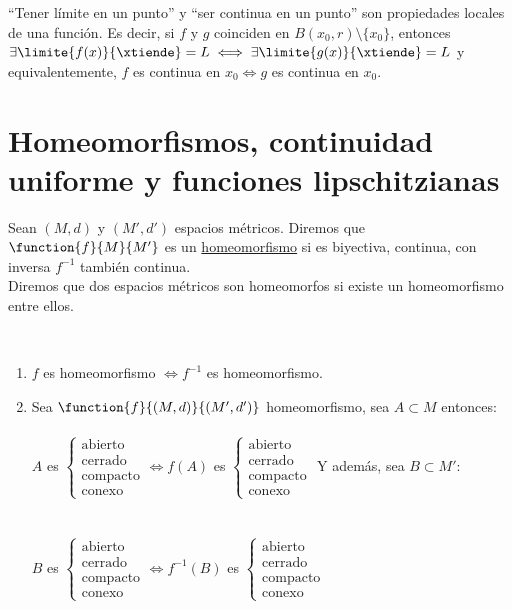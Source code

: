 	\begin{observacion} ``Tener límite en un punto'' y ``ser continua en un punto'' son propiedades locales de una función. Es decir, si $f$ y $g$ coinciden en $B(x_0,r)\setminus\{x_0\}$, entonces\\ $\exists\limite{f(x)}{\xtiende}=L\iff\exists\limite{g(x)}{\xtiende}=L$ y equivalentemente, $f$ es continua en $x_0\iff g$ es continua en $x_0$.\\
	\end{observacion}
	
	\section{Homeomorfismos, continuidad uniforme y funciones lipschitzianas}
	
	\begin{defi} Sean $(M,d)$ y $(M',d')$ espacios métricos. Diremos que $\function{f}{M}{M'}$ es un \underline{homeomorfismo} si es biyectiva, continua, con inversa $f^{-1}$ también continua.\\
	Diremos que dos espacios métricos son homeomorfos si existe un homeomorfismo entre ellos.
	\end{defi}
	
	\begin{observacion}\ \\
	\begin{enumerate}
	\item $f$ es homeomorfismo $\iff f^{-1}$ es homeomorfismo.
	\item Sea $\function{f}{(M,d)}{(M',d')}$ homeomorfismo, sea $A\subset M$ entonces:\\\\
	$A$ es $\left\{\begin{array}{ll}\mathrm{abierto}\\\mathrm{cerrado}\\\mathrm{compacto}\\\mathrm{conexo}\end{array}\right.\iff f(A)$ es $\left\{\begin{array}{ll}\mathrm{abierto}\\\mathrm{cerrado}\\\mathrm{compacto}\\\mathrm{conexo}\end{array}\right.$ Y además, sea $B\subset M':$
	\\\\\\ $B$ es $\left\{\begin{array}{ll}\mathrm{abierto}\\\mathrm{cerrado}\\\mathrm{compacto}\\\mathrm{conexo}\end{array}\right.\iff f^{-1}(B)$ es $\left\{\begin{array}{ll}\mathrm{abierto}\\\mathrm{cerrado}\\\mathrm{compacto}\\\mathrm{conexo}\end{array}\right.$
	\end{enumerate}
	\end{observacion}
	
